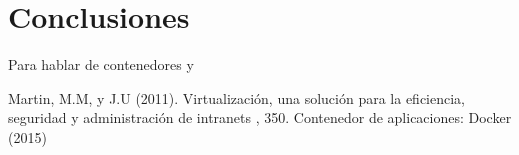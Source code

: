 \documentclass[twoside,twocolumn]{article}
\begin{document}
\section{Conclusiones}

Para hablar de contenedores y

\begin{thebibliography}{99} %

Martin, M.M,  y J.U (2011).
\newblock Virtualización, una solución para la eficiencia,
seguridad y administración de intranets
, 350.
\newblock Contenedor de aplicaciones: Docker (2015)
 
 
\end{thebibliography}

\end{document}
